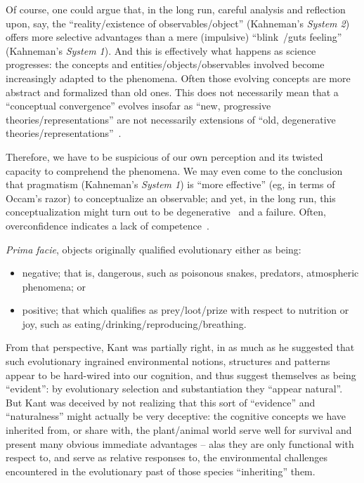 Of course, one could argue that, in the long run, careful analysis and reflection upon, say, the ``reality/existence of observables/object'' (Kahneman's {\em System 2})
offers more selective advantages than a mere (impulsive) ``blink~\cite{Gladwell-blink}/guts feeling'' (Kahneman's {\em System 1}).
And this is effectively what happens as science progresses: the concepts and entities/objects/observables involved become increasingly adapted to the phenomena.
Often those evolving concepts are more abstract and formalized than old ones.
This does not necessarily mean that a ``conceptual convergence'' evolves insofar as ``new, progressive theories/representations''
are not necessarily extensions of ``old, degenerative theories/representations''~\cite{lakatosch}.

Therefore, we have to be suspicious of our own perception and its twisted capacity to comprehend the phenomena.
We may even come to the conclusion that pragmatism (Kahneman's {\em System 1}) is ``more effective''
(eg, in terms of Occam's razor) to conceptualize an observable;
and yet, in the long run, this conceptualization might turn out to be degenerative~\cite{lakatosch} and a failure.
Often, overconfidence indicates a lack of competence~\cite{chamorroconfidence}.


{\it Prima facie}, objects originally qualified evolutionary either as being:
\begin{itemize}
\item negative; that is, dangerous, such as poisonous snakes, predators, atmospheric phenomena; or
\item positive; that which qualifies as prey/loot/prize with respect to nutrition or joy,
such as eating/drinking/reproducing/breathing.
\end{itemize}

From that perspective, Kant was partially right,
in as much as he suggested that such evolutionary ingrained environmental notions,
structures and patterns appear to be hard-wired into our cognition,
and thus suggest themselves as being ``evident'': by evolutionary selection and substantiation they ``appear natural''.
But Kant was deceived by not realizing that this sort of ``evidence'' and ``naturalness''
might actually be very deceptive:
the cognitive concepts we have inherited from, or share with,
the plant/animal world serve well for survival and present many obvious immediate advantages
-- alas they are only functional with respect to, and serve as relative responses to,
the environmental challenges encountered in the evolutionary past of those species ``inheriting'' them.


